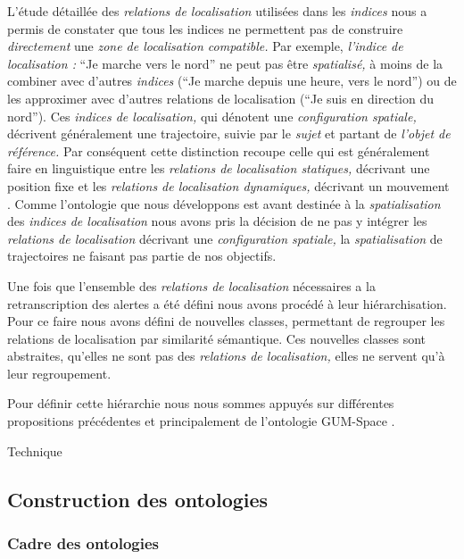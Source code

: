 L'étude détaillée des \emph{relations de localisation} utilisées dans
les \emph{indices} nous a permis de constater que tous les indices ne
permettent pas de construire \emph{directement} une \emph{zone de
  localisation compatible.} Par exemple, \emph{l'indice de
  localisation :} \enquote{Je marche vers le nord} ne peut pas être
\emph{spatialisé,} à moins de la combiner avec d'autres \emph{indices}
(\eg \enquote{Je marche depuis une heure, vers le nord}) ou de les
approximer avec d'autres relations de localisation (\eg \enquote{Je
  suis en direction du nord}). Ces \emph{indices de localisation,} qui
dénotent une \emph{configuration spatiale,} décrivent généralement une
trajectoire, suivie par le \emph{sujet} et partant de \emph{l'objet de
  référence.} Par conséquent cette distinction recoupe celle qui est
généralement faire en linguistique entre les \emph{relations de
  localisation statiques,} décrivant une position fixe et les
\emph{relations de localisation dynamiques,} décrivant un mouvement
\autocite{Borillo1998}. Comme l'ontologie que nous développons est
avant destinée à la \emph{spatialisation} des \emph{indices de
  localisation} nous avons pris la décision de ne pas y intégrer les
\emph{relations de localisation} décrivant une \emph{configuration
  spatiale,} la \emph{spatialisation} de trajectoires ne faisant pas
partie de nos objectifs.

Une fois que l'ensemble des \emph{relations de localisation}
nécessaires a la retranscription des alertes a été défini nous avons
procédé à leur hiérarchisation. Pour ce faire nous avons défini de
nouvelles classes, permettant de regrouper les relations de
localisation par similarité sémantique. Ces nouvelles classes sont
abstraites, \ie qu'elles ne sont pas des \emph{relations de
  localisation,} elles ne servent qu'à leur regroupement.

Pour définir cette hiérarchie nous nous sommes appuyés sur différentes
propositions précédentes et principalement de l'ontologie GUM-Space
\autocite{Bateman2010}.


Technique

\subsection{Construction des ontologies}

\subsubsection{Cadre des ontologies}


